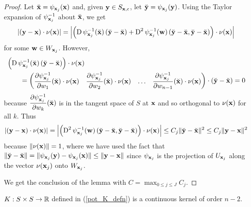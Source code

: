 \begin{proof}
Let $\displaystyle \breve{\mathbf{x}} = \psi_{\mathbf{x}_j}(\mathbf{x})$ and, given
$\displaystyle \mathbf{y} \in S_{\mathbf{x},\epsilon}$,
let $\displaystyle \breve{\mathbf{y}} = \psi_{\mathbf{x}_j}(\mathbf{y})$.
Using the Taylor expansion of $\psi_{\mathbf{x}_j}^{-1}$ about
$\breve{\mathbf{x}}$, we get
\[
\left|(\mathbf{y}- \mathbf{x})\cdot \mathbf{\nu}(\mathbf{x})\right|
= \left|\left( \operatorname{D} \psi_{\mathbf{x}_j}^{-1}(\breve{\mathbf{x}})
    \left(\breve{\mathbf{y}}- \breve{\mathbf{x}}\right)
+ \operatorname{D}^2 \psi_{\mathbf{x}_j}^{-1}(\mathbf{w})
\left(\breve{\mathbf{y}}- \breve{\mathbf{x}},\breve{\mathbf{y}}- \breve{\mathbf{x}}\right)
\right) \cdot \mathbf{\nu}(\mathbf{x})\right|
\]
for some $\displaystyle \mathbf{w} \in W_{\mathbf{x}_j}$.  However,
\begin{align*}
&\left( \operatorname{D} \psi_{\mathbf{x}_j}^{-1}(\breve{\mathbf{x}})
\left(\breve{\mathbf{y}}- \breve{\mathbf{x}} \right)\right) \cdot
\mathbf{\nu}(\mathbf{x}) \\
&\qquad = \begin{pmatrix}
\displaystyle
\frac{\partial{\psi^{-1}_{\mathbf{x}_j}}}{\partial w_1}(\breve{\mathbf{x}}) \cdot \mathbf{\nu}(\mathbf{x}) &
\displaystyle
\frac{\partial{\psi^{-1}_{\mathbf{x}_j}}}{\partial w_2}(\breve{\mathbf{x}}) \cdot \mathbf{\nu}(\mathbf{x}) &
\ldots &
\displaystyle
\frac{\partial{\psi^{-1}_{\mathbf{x}_j}}}{\partial w_{n-1}}(\breve{\mathbf{x}}) \cdot \mathbf{\nu}(\mathbf{x})
\end{pmatrix} \cdot
\left(\breve{\mathbf{y}}- \breve{\mathbf{x}} \right) = 0
\end{align*}
because $\displaystyle \frac{\partial{\psi^{-1}_{\mathbf{x}_j}}}{\partial w_k}(\breve{\mathbf{x}})$
is in the tangent space of $S$ at $\mathbf{x}$ and so orthogonal to
$\mathbf{\nu}(\mathbf{x})$ for all $k$.  Thus
\[
\left|(\mathbf{y}- \mathbf{x})\cdot \mathbf{\nu}(\mathbf{x})\right|
= \left|\left(\operatorname{D}^2 \psi_{\mathbf{x}_j}^{-1}(\mathbf{w})
\left(\breve{\mathbf{y}}- \breve{\mathbf{x}},\breve{\mathbf{y}}- \breve{\mathbf{x}}\right)
\right) \cdot \mathbf{\nu}(\mathbf{x})\right|
\leq C_j \|\breve{\mathbf{y}}- \breve{\mathbf{x}}\|^2
\leq C_j \|\mathbf{y}- \mathbf{x}\|^2
\]
because $\|\mathbf{\nu}(\mathbf{x})\| = 1$, where we have used the fact that
$\displaystyle \|\breve{\mathbf{y}}- \breve{\mathbf{x}}\|
=\| \psi_{\mathbf{x}_j}(\mathbf{y})- \psi_{\mathbf{x}_j}(\mathbf{x})\|
\leq \| \mathbf{y}- \mathbf{x}\|$ since
$\displaystyle \psi_{\mathbf{x}_j}$ is the projection of
$\displaystyle U_{\mathbf{x}_j}$ along the vector
$\displaystyle \nu(\mathbf{x}_j)$ onto
$\displaystyle W_{\mathbf{x}_j}$.

 We get the conclusion of the lemma with
$\displaystyle C = \max_{0\leq j \leq J} C_j$.
\end{proof}

\begin{lemma} \label{pot_lem_dbl2}
$K: S \times S \rightarrow \mathbb{R}$ defined in
(\ref{pot_K_defn}) is a continuous kernel of order $n-2$.
\end{lemma}

